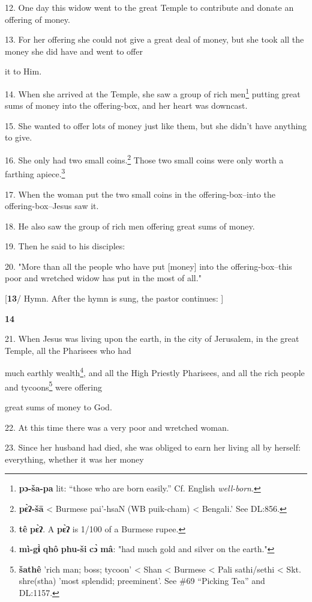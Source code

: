 12. One day this widow went to the great Temple to contribute and donate an offering
of money.

13. For her offering she could not give a great deal of money, but she took all
the money she did have and went to offer

it to Him.

14. When she arrived at the Temple, she saw a group of rich men\footnote{\textbf{pɔ-ša-pa} lit: ``those who are born easily.'' Cf. English \textit{well-born}.} putting great
sums of money into the offering-box, and her heart was downcast.

15. She wanted to offer lots of money just like them, but she didn't have anything
to give.

16. She only had two small coins.\footnote{\textbf{pɛ̀ʔ-šā} < Burmese pai'-hsaN (WB puik-cham) < Bengali.' See DL:856.} Those two small coins were only worth a farthing
apiece.\footnote{\textbf{tê} \textbf{pɛ̀ʔ}. A \textbf{pɛ̀ʔ} is 1/100 of a Burmese rupee.}

17. When the woman put the two small coins in the offering-box--into the offering-box--Jesus
saw it.

18. He also saw the group of rich men offering great sums of money.

19. Then he said to his disciples:

20. "More than all the people who have put [money] into the offering-box--this
poor and wretched widow has put in the most of all."

[\textbf{13}/ Hymn. After the hymn is sung, the pastor continues: ]

\textbf{14 }

21. When Jesus was living upon the earth, in the city of Jerusalem, in the great
Temple, all the Pharisees who had

much earthly wealth\footnote{\textbf{mì-gɨ̀} \textbf{qhô} \textbf{phu-ši} \textbf{cɔ̀} \textbf{mâ}: "had much gold and silver on the earth."}, and all the High Priestly Pharisees, and all the rich
people and tycoons\footnote{\textbf{šathê} 'rich man; boss; tycoon' < Shan < Burmese < Pali sathi/sethi < Skt. shre(stha) 'most splendid; preeminent'. See \#69 ``Picking Tea'' and DL:1157.} were offering

great sums of money to God.

22. At this time there was a very poor and wretched woman.

23. Since her husband had died, she was obliged to earn her living all by herself:
everything, whether it was her money

